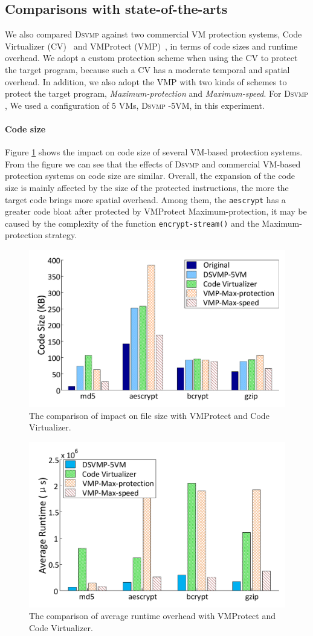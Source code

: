 \documentclass[times]{secauth}
\newcommand{\DSVMP}{\textsc{Dsvmp }}
\begin{document}
\subsection{Comparisons with state-of-the-arts}
We also compared \DSVMP against two commercial VM protection systems,
Code Virtualizer (CV)~\cite{2CV} and VMProtect (VMP)~\cite{3Vmprotect}, in terms of code sizes and runtime overhead.
We adopt a custom protection scheme when using the CV to protect the target program,
because such a CV has a moderate temporal and spatial overhead.
In addition, we also adopt the VMP with two kinds of schemes to protect the target program,
\emph{Maximum-protection} and \emph{Maximum-speed}.
For \DSVMP, We used a configuration of 5 VMs, \DSVMP-5VM, in this experiment.



\paragraph*{Code size} Figure \ref{fig:Fig.com-size} shows the impact on code size of several VM-based protection systems.
From the figure we can see that the effects of \DSVMP and commercial VM-based protection systems on code size are similar.
Overall, the expansion of the code size is mainly affected by the size of the protected instructions,
the more the target code brings more spatial overhead.
Among them, the \texttt{aescrypt} has a greater code bloat after protected by VMProtect Maximum-protection,
it may be caused by the complexity of the function \texttt{encrypt-stream()} and the Maximum-protection strategy.

\begin{figure}[!t]
\centering
\includegraphics[width=.45\textwidth]{figure/comsize.pdf}
\caption{The comparison of impact on file size with VMProtect and Code Virtualizer.}\label{fig:Fig.com-size}
\end{figure}

\begin{figure}[!t]
\centering
\includegraphics[width=.45\textwidth]{figure/comtime.pdf}
\caption{The comparison of average runtime overhead with VMProtect and Code Virtualizer.}\label{fig:Fig.com-time}
\end{figure}
\end{document}
